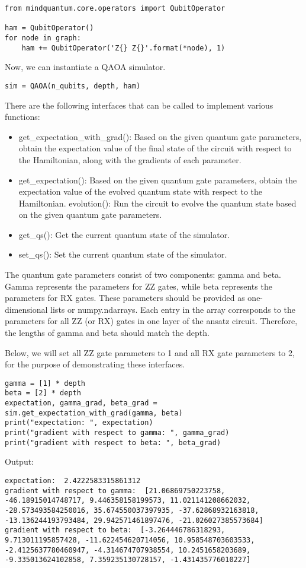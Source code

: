 \begin{lstlisting}
from mindquantum.core.operators import QubitOperator

ham = QubitOperator()
for node in graph:
    ham += QubitOperator('Z{} Z{}'.format(*node), 1)
\end{lstlisting}

Now, we can instantiate a QAOA simulator.
\begin{lstlisting}
sim = QAOA(n_qubits, depth, ham)
\end{lstlisting}

There are the following interfaces that can be called to implement various functions:

\begin{itemize}
    \item get\_expectation\_with\_grad(): Based on the given quantum gate parameters, obtain the expectation value of the final state of the circuit with respect to the Hamiltonian, along with the gradients of each parameter.
    \item get\_expectation(): Based on the given quantum gate parameters, obtain the expectation value of the evolved quantum state with respect to the Hamiltonian.
evolution(): Run the circuit to evolve the quantum state based on the given quantum gate parameters.
    \item get\_qs(): Get the current quantum state of the simulator.
    \item set\_qs(): Set the current quantum state of the simulator.
\end{itemize}

The quantum gate parameters consist of two components: gamma and beta. Gamma represents the parameters for ZZ gates, while beta represents the parameters for RX gates. These parameters should be provided as one-dimensional lists or numpy.ndarrays. Each entry in the array corresponds to the parameters for all ZZ (or RX) gates in one layer of the ansatz circuit. Therefore, the lengths of gamma and beta should match the depth.

Below, we will set all ZZ gate parameters to 1 and all RX gate parameters to 2, for the purpose of demonstrating these interfaces.

\begin{lstlisting}
gamma = [1] * depth
beta = [2] * depth
expectation, gamma_grad, beta_grad = sim.get_expectation_with_grad(gamma, beta)
print("expectation: ", expectation)
print("gradient with respect to gamma: ", gamma_grad)
print("gradient with respect to beta: ", beta_grad)
\end{lstlisting}
Output:
\begin{lstlisting}
expectation:  2.4222583315861312
gradient with respect to gamma:  [21.06869750223758, -46.18915014748717, 9.446358158199573, 11.021141208662032, -28.573493584250016, 35.674550037397935, -37.62868932163818, -13.136244193793484, 29.942571461897476, -21.026027385573684]
gradient with respect to beta:  [-3.264446786318293, 9.713011195857428, -11.622454620714056, 10.958548703603533, -2.4125637780460947, -4.314674707938554, 10.2451658203689, -9.335013624102858, 7.359235130728157, -1.431435776010227]
\end{lstlisting}
